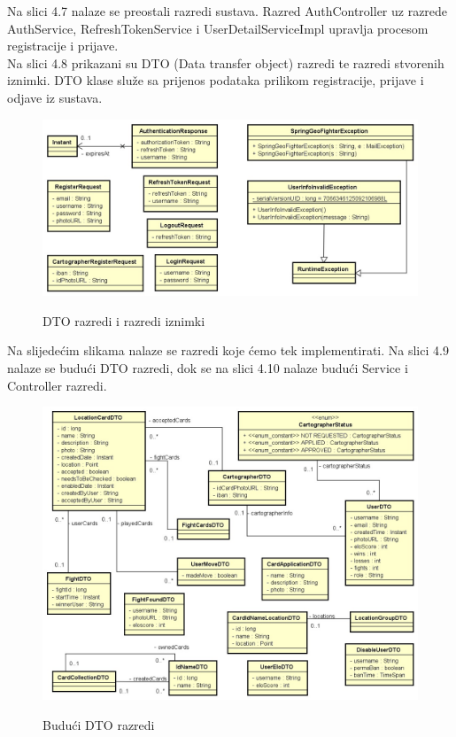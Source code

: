			\textnormal{Na slici 4.7 nalaze se preostali razredi sustava. Razred AuthController uz razrede AuthService, RefreshTokenService i UserDetailServiceImpl upravlja procesom registracije i prijave.} \\
			
			\textnormal{Na slici 4.8 prikazani su DTO (Data transfer object) razredi te razredi stvorenih iznimki. DTO klase služe sa prijenos podataka prilikom registracije, prijave i odjave iz sustava. }
			
			\begin{figure}[H]
				\centering
				\includegraphics[scale=0.75]{slike/dtoCD} \\
				\caption{ DTO razredi i razredi iznimki}
				\label{fig:dtoCD}
			\end{figure}
			
			\textnormal{Na slijedećim slikama nalaze se razredi koje ćemo tek implementirati. Na slici 4.9 nalaze se budući DTO razredi, dok se na slici 4.10 nalaze budući Service i Controller razredi.}
			
			\begin{figure}[H]
				\centering
				\includegraphics[scale=0.75]{slike/buduciDTO} \\
				\caption{ Budući DTO razredi}
				\label{fig:dtoBuduci}
			\end{figure}
		
